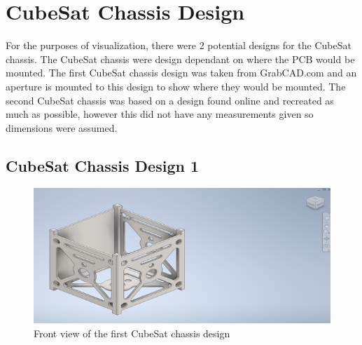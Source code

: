 \section{CubeSat Chassis Design}


For the purposes of visualization, there were 2 potential designs for the CubeSat chassis. The CubeSat chassis were design dependant on where the PCB would be mounted. The first CubeSat chassis design was taken from GrabCAD.com and an aperture is mounted to this design to show where they would be mounted. The second CubeSat chassis was based on a design found online and recreated as much as possible, however this did not have any measurements given so dimensions were assumed.

\subsection{CubeSat Chassis Design 1}

\begin{figure}[htbp]
    \centering
    \includegraphics[width=\textwidth]{chapters/methodology/CubeSatDesign/Fig1CAD.png}
    \caption{Front view of the first CubeSat chassis design}
    \label{fig:cubesat-chassis1-front}
    \end{figure}

